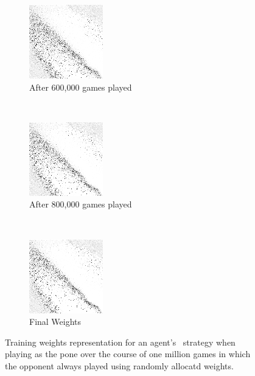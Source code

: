 \begin{figure}
	\begin{subfigure}[t]{0.3\textwidth}
	\centering
	\includegraphics[width=\stratgraphwidth]{images/findings/round2/flipbook/random/checkpoint_600000.png}
	\caption{After 600,000 games played}
	\end{subfigure}
	~
	\begin{subfigure}[t]{0.3\textwidth}
	\centering
	\includegraphics[width=\stratgraphwidth]{images/findings/round2/flipbook/random/checkpoint_800000.png}
	\caption{After 800,000 games played}
	\end{subfigure}
	~
	\begin{subfigure}[t]{0.3\textwidth}
	\centering
	\includegraphics[width=\stratgraphwidth]{images/findings/round2/flipbook/random/checkpoint_999999.png}
	\caption{Final Weights}
	\end{subfigure}

\caption{
	Training weights representation for an agent's \handmaxavg\ strategy
	when playing as the pone
	over the course of one million games
	in which the opponent always played using randomly allocatd weights.
}
\label{fig:r2-flip-random}
\end{figure}
